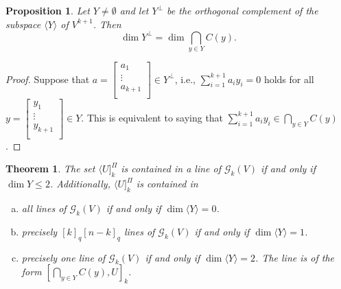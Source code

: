 \documentclass[12pt]{article}
\newtheorem{theorem}{Theorem}
\newtheorem{prop}{Proposition}
\theoremstyle{definition}
\begin{document}
 \begin{prop}\label{dimCy}
 Let $Y\neq \emptyset$ and let $Y^\perp$ be the orthogonal complement of the subspace $\langle Y\rangle$ of $V^{k+1}$. Then
   $$\dim Y^\perp=\dim\bigcap_{y\in Y}C(y).$$
\end{prop}
\begin{proof}
Suppose that $a=\left[
\begin{array}{cccc}
a_1\\
\vdots\\
a_{k+1}\\
\end{array}
\right] \in Y^\perp$, i.e., $\sum^{k+1}_{i=1}a_{i}y_{i}=0$ holds for all\linebreak $y=\left[
\begin{array}{cccc}
y_1\\
\vdots\\
y_{k+1}\\
\end{array}
\right]\in Y$. This is equivalent to saying that $\sum^{k+1}_{i=1}a_{i}y_{i}\in \bigcap_{y\in Y}C(y)$.
\end{proof}
\begin{theorem}\label{liney}
  The set $\langle U]^{\Pi}_{k}$ is contained in a line of  ${\mathcal G}_{k}(V)$ if and only if $\dim Y\leqslant2$.
  Additionally, $\langle U]^{\Pi}_{k}$ is contained in
  \begin{enumerate}[a)]
    \item\label{dim0} all lines of ${\mathcal G}_{k}(V)$  if and only if $\dim \langle Y\rangle=0$.
    \item\label{dim1} precisely $[k]_q[n-k]_q$ lines of ${\mathcal G}_{k}(V)$  if and only if $\dim \langle Y\rangle=1$.
    \item\label{dim2} precisely one line of ${\mathcal G}_{k}(V)$  if and only if $\dim \langle Y\rangle=2$. The line is of the form $[\bigcap_{y\in Y}C(y), U]_k$.
  \end{enumerate}
\end{theorem}
\end{document}
